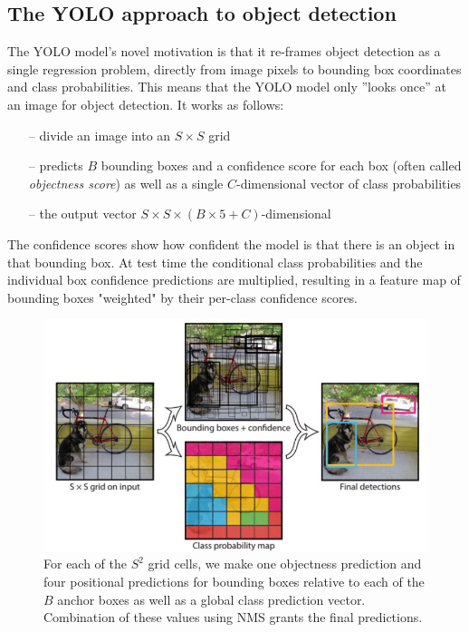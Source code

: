 \documentclass[a4paper]{article}
\begin{document}
\subsection*{The YOLO approach to object detection}
The YOLO model’s novel motivation is that it re-frames
object detection as a single regression problem, directly
from image pixels to bounding box coordinates and class
probabilities. This means that the YOLO model only ”looks
once” at an image for object detection.
It works as follows: 
\begin{itemize}
\item[--] divide an image into an $S\times S$ grid
\item[--]  predicts $B$ bounding boxes and a confidence score for each box (often called \textit{objectness score}) as well as a single $C$-dimensional vector of class probabilities
\item[--]  the output vector $S \times S \times (B\times 5 +C)$-dimensional
\end{itemize} The confidence scores show how confident the
model is that there is an object in that bounding box. At test time the conditional class probabilities and the individual box confidence predictions are multiplied, resulting in a feature map of bounding boxes "weighted" by their per-class confidence scores.
\begin{figure}

\includegraphics[scale=0.35]{yolo_model}

\caption{For each of the $S^2$ grid cells, we make one objectness prediction and four positional predictions for bounding boxes relative to each of the $B$ anchor boxes as well as a global class prediction vector. Combination of these values using NMS grants the final predictions.}


\end{figure}
\end{document}
